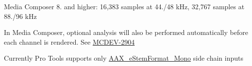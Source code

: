 \begin{DoxyRefList}
\begin{DoxyItemize}
\item Media Composer 8. and higher\+: 16,383 samples at 44./48 k\+Hz, 32,767 samples at 88./96 k\+Hz  
\end{DoxyItemize}
\item[Member \mbox{\hyperlink{a00662_a13e384f22825afd3db6d68395b79ce0da5a2bacb421fc36f890a121f01a9e72ba}{A\+A\+X\+\_\+e\+Property\+\_\+\+Optional\+Analysis}} ]\label{a00786__compatibility_notes000068}%
%
 In Media Composer, optional analysis will also be performed automatically before each channel is rendered. See \mbox{\hyperlink{a00846_MCDEV-2904}{M\+C\+D\+E\+V-\/2904}} 
\item[Member \mbox{\hyperlink{a00662_a13e384f22825afd3db6d68395b79ce0dae71ad10ce55fb8c4076fe70315b689ae}{A\+A\+X\+\_\+e\+Property\+\_\+\+Side\+Chain\+Stem\+Format}} ]\label{a00786__compatibility_notes000066}%
%
 Currently Pro Tools supports only \mbox{\hyperlink{a00491_ad8af5ef008b2bd478add9a0acb0a1d85a0cc08ddb9923a4093c820efe84588947}{A\+A\+X\+\_\+e\+Stem\+Format\+\_\+\+Mono}} side chain inputs


\end{DoxyRefList}
